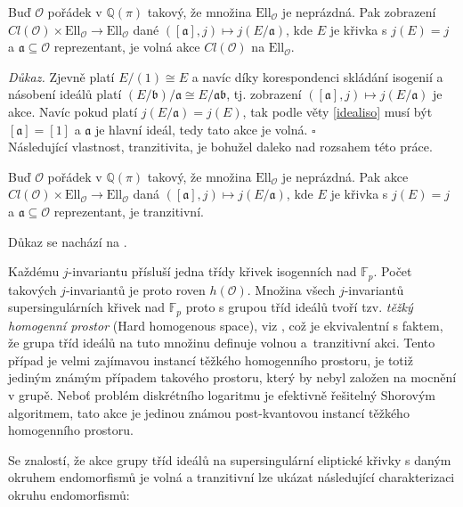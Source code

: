 \documentclass[12pt]{report}
\begin{document}
\begin{veta}
Buď $\mathcal{O}$ pořádek v $\mathbb{Q}(\pi)$ takový, že množina $\mathrm{Ell}_{\mathcal{O}}$ je neprázdná. Pak zobrazení $Cl(\mathcal{O}) \times \mathrm{Ell}_{\mathcal{O}} \longrightarrow \mathrm{Ell}_{\mathcal{O}}$ dané $([\mathfrak{a}],j) \longmapsto j(E/\mathfrak{a})$, kde $E$ je křivka s $j(E) = j$ a $\mathfrak{a} \subseteq \mathcal{O}$ reprezentant, je volná akce $Cl(\mathcal{O})$ na $\mathrm{Ell}_{\mathcal{O}}$.
\end{veta}

\noindent \textit{Důkaz.} Zjevně platí $E/(1) \cong E$ a navíc díky korespondenci skládání isogenií a násobení ideálů platí $(E/\mathfrak{b})/\mathfrak{a} \cong E/\mathfrak{ab}$, tj. zobrazení $([\mathfrak{a}],j) \longmapsto j(E/\mathfrak{a})$ je akce. Navíc pokud platí $j(E/\mathfrak{a}) = j(E)$, tak podle věty \ref{idealiso} musí být $[\mathfrak{a}] = [1]$ a $\mathfrak{a}$ je hlavní ideál, tedy tato akce je volná. \hfill $\square$\\ 

Následující vlastnost, tranzitivita, je bohužel daleko nad rozsahem této práce.
\begin{veta}
Buď $\mathcal{O}$ pořádek v $\mathbb{Q}(\pi)$ takový, že množina $\mathrm{Ell}_{\mathcal{O}}$ je neprázdná. Pak akce $Cl(\mathcal{O}) \times \mathrm{Ell}_{\mathcal{O}} \longrightarrow \mathrm{Ell}_{\mathcal{O}}$ daná $([\mathfrak{a}],j) \longmapsto j(E/\mathfrak{a})$, kde $E$ je křivka s $j(E) = j$ a $\mathfrak{a} \subseteq \mathcal{O}$ reprezentant, je tranzitivní.
\end{veta}
Důkaz se nachází na \cite[Thm. 4.5]{Waterhouse}.

Každému $j$-invariantu přísluší jedna třídy křivek isogenních nad $\mathbb{F}_p$. Počet takových $j$-invariantů je proto roven $h (\mathcal{O})$. Množina všech $j$-invariantů supersingulárních křivek nad $\mathbb{F}_p$ proto s grupou tříd ideálů tvoří tzv. \textit{těžký homogenní prostor} (Hard homogenous space), viz \cite{Couveignes}, což je ekvivalentní s faktem, že grupa tříd ideálů na tuto množinu definuje volnou a~tranzitivní akci. Tento případ je velmi zajímavou instancí těžkého homogenního prostoru, je totiž jediným známým případem takového prostoru, který by nebyl založen na mocnění v grupě. Neboť problém diskrétního logaritmu je efektivně řešitelný Shorovým algoritmem, tato akce je jedinou známou post-kvantovou instancí těžkého homogenního prostoru.

Se znalostí, že akce grupy tříd ideálů na supersingulární eliptické křivky s daným okruhem endomorfismů je volná a tranzitivní lze ukázat následující charakterizaci okruhu endomorfismů:
\end{document}
